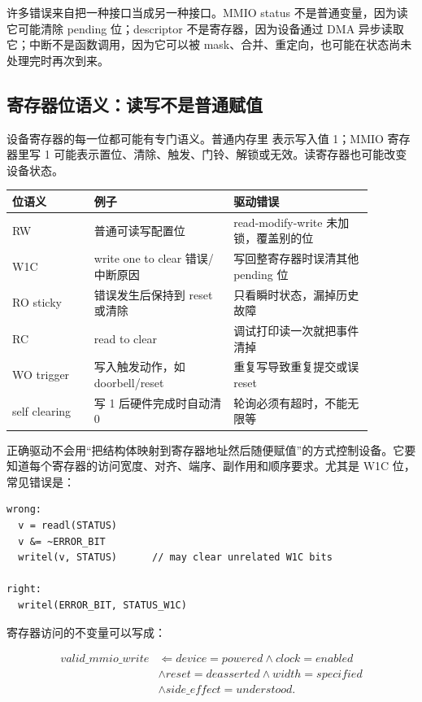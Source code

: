 许多错误来自把一种接口当成另一种接口。MMIO status 不是普通变量，因为读它可能清除 pending 位；descriptor 不是寄存器，因为设备通过 DMA 异步读取它；中断不是函数调用，因为它可以被 mask、合并、重定向，也可能在状态尚未处理完时再次到来。

\subsection{寄存器位语义：读写不是普通赋值}

设备寄存器的每一位都可能有专门语义。普通内存里  表示写入值 1；MMIO 寄存器里写 1 可能表示置位、清除、触发、门铃、解锁或无效。读寄存器也可能改变设备状态。

\begin{longtable}{p{0.20\linewidth}p{0.34\linewidth}p{0.34\linewidth}}
\toprule
位语义 & 例子 & 驱动错误 \\
\midrule
RW & 普通可读写配置位 & read-modify-write 未加锁，覆盖别的位 \\
W1C & write one to clear 错误/中断原因 & 写回整寄存器时误清其他 pending 位 \\
RO sticky & 错误发生后保持到 reset 或清除 & 只看瞬时状态，漏掉历史故障 \\
RC & read to clear & 调试打印读一次就把事件清掉 \\
WO trigger & 写入触发动作，如 doorbell/reset & 重复写导致重复提交或误 reset \\
self clearing & 写 1 后硬件完成时自动清 0 & 轮询必须有超时，不能无限等 \\
\bottomrule
\end{longtable}

正确驱动不会用“把结构体映射到寄存器地址然后随便赋值”的方式控制设备。它要知道每个寄存器的访问宽度、对齐、端序、副作用和顺序要求。尤其是 W1C 位，常见错误是：

\begin{lstlisting}
wrong:
  v = readl(STATUS)
  v &= ~ERROR_BIT
  writel(v, STATUS)      // may clear unrelated W1C bits

right:
  writel(ERROR_BIT, STATUS_W1C)
\end{lstlisting}

寄存器访问的不变量可以写成：

\[
\begin{aligned}
valid\_mmio\_write
&\Leftarrow device=powered \land clock=enabled\\
&\land reset=deasserted \land width=specified\\
&\land side\_effect=understood.
\end{aligned}
\]

